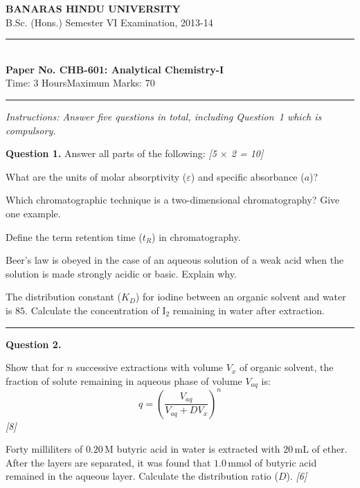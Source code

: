 \documentclass[11pt,a4paper]{article}
\newcommand{\pts}[1]{\hfill   \textit{[#1]}}
\begin{document}
\begin{center}
  {\large\bfseries BANARAS HINDU UNIVERSITY}\\[2pt]
  {\normalsize B.Sc. (Hons.) Semester VI Examination, 2013-14}\\[6pt]
  \rule{0.8\linewidth}{0.5pt}\\[6pt]
  {\large\bfseries Paper No. CHB-601: Analytical Chemistry-I}\\[4pt]
  {\normalsize Time: 3 Hours\hfill Maximum Marks: 70}
\end{center}
\rule{\linewidth}{0.4pt}
\small



\noindent   \textit{Instructions: Answer five questions in total, including Question~1 which is compulsory.}

\normalsize
\bigskip




\noindent   \textbf{Question 1.} Answer all parts of the following: \pts{5 $ \times$ 2 = 10}

\begin{parts}
  \item What are the units of molar absorptivity ($\varepsilon$) and specific absorbance ($a$)?
  \item Which chromatographic technique is a two-dimensional chromatography? Give one example.
  \item Define the term retention time ($t_R$) in chromatography.
  \item Beer's law is obeyed in the case of an aqueous solution of a weak acid when the solution is made strongly acidic or basic. Explain why.
  \item The distribution constant ($K_D$) for iodine between an organic solvent and water is $85$. Calculate the concentration of $ \text{I}_2$ remaining in water after extraction.
\end{parts}

\medskip\rule{\linewidth}{0.2pt}




\noindent   \textbf{Question 2.}

\begin{parts}
  \item Show that for $n$ successive extractions with volume $V_x$ of organic solvent, the fraction of solute remaining in aqueous phase of volume $V_{aq}$ is:
    \[ q = \left( \frac{V_{aq}}{V_{aq} + D V_x} \right)^n \] \pts{8}
  \item Forty milliliters of $0.20\, \text{M}$ butyric acid in water is extracted with $20\, \text{mL}$ of ether. After the layers are separated, it was found that $1.0\, \text{mmol}$ of butyric acid remained in the aqueous layer. Calculate the distribution ratio ($D$). \pts{6}
\end{parts}
\end{document}
